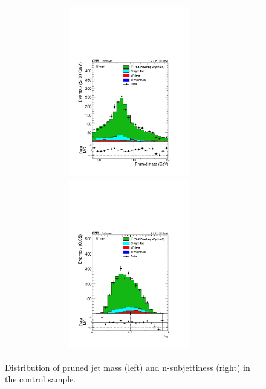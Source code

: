 \begin{figure}[ht!]
\centering
\begin{tabular}{cc}
\includegraphics[width=0.5\textwidth]{figures/vtagging/AN-16-215/Whadr_pruned_mu.pdf}
\includegraphics[width=0.5\textwidth]{figures/vtagging/AN-16-215/Whadr_tau21_mu.pdf}\\
\end{tabular}
\caption{Distribution of pruned jet mass (left) and n-subjettiness (right) in the \ttbar control sample.} 
\label{fig:searchI:ttbarcp}
\end{figure}

